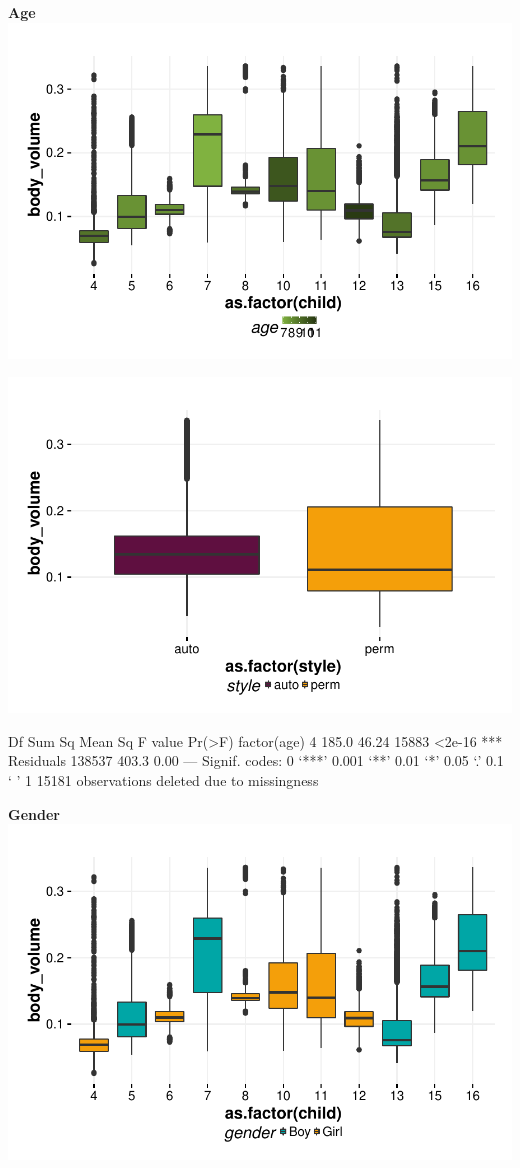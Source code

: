 \documentclass{article}
\begin{document}
\textbf{Age}
\includegraphics{features-plot_body_volume_child_age_quiz}

\includegraphics{features-plot_body_volume_style_quiz}

\begin{Schunk}
\begin{Soutput}
                Df Sum Sq Mean Sq F value Pr(>F)    
factor(age)      4  185.0   46.24   15883 <2e-16 ***
Residuals   138537  403.3    0.00                   
---
Signif. codes:  0 ‘***’ 0.001 ‘**’ 0.01 ‘*’ 0.05 ‘.’ 0.1 ‘ ’ 1
15181 observations deleted due to missingness
\end{Soutput}
\end{Schunk}

\textbf{Gender}
\includegraphics{features-plot_body_volume_child_gender_quiz}
\end{document}
